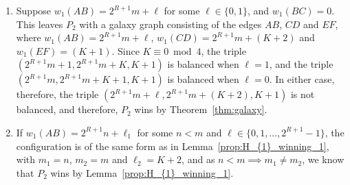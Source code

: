\documentclass[11pt,reqno]{amsart}
\theoremstyle{definition}
\theoremstyle{definition}
\begin{document}
\begin{enumerate}
\begin{enumerate}
\item Suppose $w_{1}(AB)=2^{R+1}m+\ell$ for some $\ell \in \{0,1\}$, and $w_{1}(BC)=0$. This leaves $P_{2}$ with a galaxy graph consisting of the edges $AB$, $CD$ and $EF$, where $w_{1}(AB)=2^{R+1}m+\ell$, $w_{1}(CD)=2^{R+1}m+(K+2)$ and $w_{1}(EF)=(K+1)$. Since $K \equiv 0 \bmod 4$, the triple $(2^{R+1}m+1,2^{R+1}m+K,K+1)$ is balanced when $\ell=1$, and the triple $(2^{R+1}m,2^{R+1}m+K+1,K+1)$ is balanced when $\ell=0$. In either case, therefore, the triple $(2^{R+1}m+\ell,2^{R+1}m+(K+2),K+1)$ is not balanced, and therefore, $P_{2}$ wins by Theorem~\ref{thm:galaxy}.

\item If $w_{1}(AB)=2^{R+1}n+\ell_{1}$ for some $n < m$ and $\ell\in\{0,1,\ldots,2^{R+1}-1\}$, the configuration is of the same form as in Lemma~\ref{prop:H_{1}_winning_1}, with $m_{1}=n$, $m_{2}=m$ and $\ell_{2}=K+2$, and as $n < m \implies m_{1}\neq m_{2}$, we know that $P_{2}$ wins by Lemma~\ref{prop:H_{1}_winning_1}.
\end{enumerate}


\end{enumerate}
\end{document}
